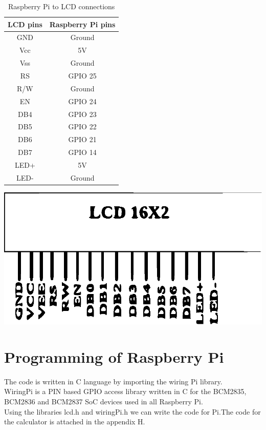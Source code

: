 \documentclass[11pt]{article}
\begin{document}
	\begin{table}[ht]
		\begin{minipage}[b]{0.56\linewidth}
			\centering
			\begin{tabular}{ |c|c| }
			\hline
			LCD pins & Raspberry Pi pins\\
			\hline
			GND & Ground\\
			Vcc & 5V\\
			Vss & Ground\\
			RS  & GPIO 25\\
			R/W & Ground\\
			EN  & GPIO 24\\
			DB4 & GPIO 23\\
			DB5 & GPIO 22\\
			DB6 & GPIO 21\\
			DB7 & GPIO 14\\
			LED+ & 5V\\
			LED- & Ground\\
			\hline
			\end{tabular}
			\caption{Raspberry Pi to LCD connections}
			\label{Table}			
	\end{minipage}	
	\hfill
		\begin{minipage}[h]{.5\linewidth}
		\centering
		\vspace{-5cm}
		\includegraphics[scale=1]{lcd}
		\label{fig:1}
	\end{minipage}
\end{table}
\section{Programming of Raspberry Pi}
	The code is written in C language by importing the wiring Pi library.\\
	WiringPi is a PIN based GPIO access library written in C for the BCM2835, BCM2836 and BCM2837 SoC devices used in all Raspberry Pi.\\
	Using the libraries lcd.h and wiringPi.h we can write the code for Pi.The code for the calculator is attached in the appendix H.
	
\end{document}

